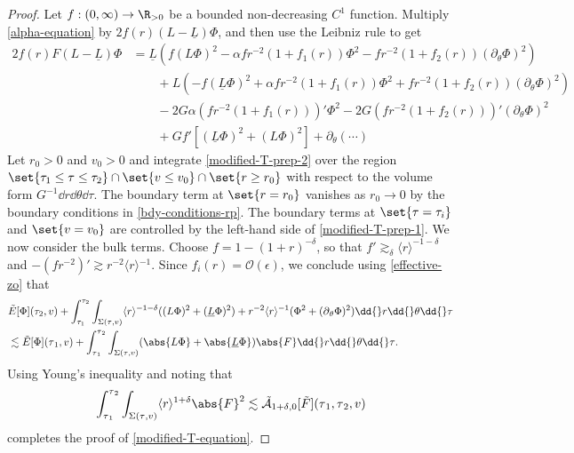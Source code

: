 \documentclass[10pt, reqno]{amsart}
\begin{document}
\begin{proof}
 Let \(f:(0,\infty)\to \R_{>0}\) be a bounded
non-decreasing \(C^1\) function. Multiply \cref{alpha-equation} by
\(2f(r)(L-\underline{L})\Phi{}\), and then use the Leibniz rule to get
\begin{equation}\label{modified-T-prep-2}
\begin{split}
2f(r)F(L-\underline{L})\Phi{} &= \underline{L}(f(L\Phi{})^2 - \alpha{}f r^{-2}(1+f_1(r))\Phi^2 - f r^{-2}(1+f_2(r))(\partial{}_\theta{}\Phi{})^2) \\
&\qquad + L(-f(\underline{L}\Phi{})^2 + \alpha{}fr^{-2}(1+f_1(r))\Phi^2 + f r^{-2}(1+f_2(r))(\partial{}_\theta{}\Phi{})^2) \\
&\qquad - 2G\alpha{}(fr^{-2}(1+f_1(r)))'\Phi^2 - 2G(fr^{-2}(1+f_2(r)))'(\partial{}_\theta{}\Phi{})^2 \\
&\qquad + Gf'[(\underline{L}\Phi{})^2 + (L\Phi{})^2] + \partial{}_\theta{}(\cdots{})
\end{split}
\end{equation}
Let \(r_0 > 0\) and \(v_0 > 0\) and integrate \cref{modified-T-prep-2} over the
region \(\set{\tau_1\le \tau{}\le \tau_2}\cap \set{v\le v_0}\cap \set{r\ge
r_0}\) with respect to the volume form \(G^{-1}\dd{}r\dd{}\theta{}\dd{}\tau{}\).
The boundary term at \(\set{r=r_0}\) vanishes as \(r_0\to 0\) by the boundary
conditions in \cref{bdy-conditions-rp}. The boundary terms at
\(\set{\tau{}=\tau_i}\) and \(\set{v=v_0}\) are controlled by the left-hand side of
\cref{modified-T-prep-1}. We now consider the bulk terms. Choose \(f = 1 - (1 +
r)^{-\delta{}}\), so that \(f'\gtrsim_\delta{} \langle{}r\rangle^{-1-\delta{}}\)
and \(-(f r^{-2})' \gtrsim r^{-2}\langle{}r\rangle{}^{-1}\). Since \(f_i(r) = \mathcal{O}(\epsilon{})\), we
conclude using \cref{effective-zo} that
\begin{equation}
\begin{split}
&\tilde{E}[\Phi{}](\tau_2,v) + \int_{\tau_1}^{\tau_2} \int _{\Sigma{}(\tau{},v)} \langle{}r\rangle^{-1-\delta{}}((L\Phi{})^2 + (\underline{L}\Phi{})^2) + r^{-2}\langle{}r\rangle{}^{-1}(\Phi^2 + (\partial{}_\theta{}\Phi{})^2)\dd{}r\dd{}\theta{}\dd{}\tau{}\\
&\lesssim \tilde{E}[\Phi{}](\tau{}_1,v) + \int_{\tau{}_1}^{\tau{}_2} \int _{\Sigma{}(\tau{},v)}(\abs{L\Phi{}} + \abs{\underline{L}\Phi{}})\abs{F}\dd{}r\dd{}\theta{}\dd{}\tau{}.
\end{split}
\end{equation}
Using Young's inequality and noting that
\begin{equation}
\int_{\tau{}_1}^{\tau{}_2} \int _{\Sigma{}(\tau{},v)} \langle{}r\rangle^{1+\delta{}}\abs{F}^2\lesssim \tilde{\mathcal{A}}_{1+\delta{},0}[\tilde{F}](\tau{}_1,\tau{}_2,v)
\end{equation}
completes the proof of \cref{modified-T-equation}.
\end{proof}
\end{document}
